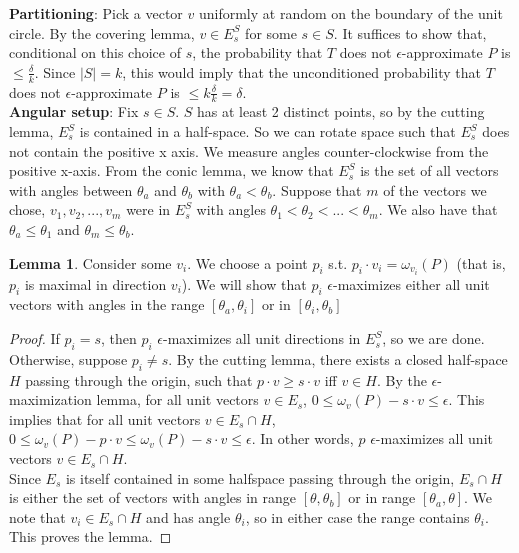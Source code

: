 \documentclass[12pt]{article}
\theoremstyle{definition}
\theoremstyle{lemma}
\newtheorem{lemma}{Lemma}[section]
\theoremstyle{theorem}
\begin{document}
\textbf{Partitioning}: Pick a vector $v$ uniformly at random on the boundary of the unit circle. By the covering lemma, $v \in E^S_s$ for some $s \in S$. It suffices to show that, conditional on this choice of $s$, the probability that $T$ does not $\epsilon$-approximate $P$ is $\leq \frac{\delta}{k}$. Since $|S| = k$, this would imply that the unconditioned probability that $T$ does not $\epsilon$-approximate $P$ is $\leq k\frac{\delta}{k} = \delta$.
\\

\textbf{Angular setup}: Fix $s \in S$. $S$ has at least 2 distinct points, so by the cutting lemma, $E^S_s$ is contained in a half-space. So we can rotate space such that $E^S_s$ does not contain the positive x axis. We measure angles counter-clockwise from the positive x-axis. From the conic lemma, we know that $E^S_s$ is the set of all vectors with angles between $\theta_a$ and $\theta_b$ with $\theta_a < \theta_b$. Suppose that $m$ of the vectors we chose, $v_1, v_2, ..., v_m$ were in $E^S_s$ with angles $\theta_1 < \theta_2 < ... < \theta_m$. We also have that $\theta_a \leq \theta_1$ and $\theta_m \leq \theta_b$.
\\

\begin{lemma}
Consider some $v_i$. We choose a point $p_i$ s.t. $p_i \cdot v_i = \omega_{v_i}(P)$ (that is, $p_i$ is maximal in direction $v_i$). We will show that $p_i$ $\epsilon$-maximizes either all unit vectors with angles in the range $[\theta_a, \theta_i]$ or in $[\theta_i, \theta_b]$
\end{lemma}

\begin{proof}
If $p_i = s$, then $p_i$ $\epsilon$-maximizes all unit directions in $E^S_s$, so we are done. Otherwise, suppose $p_i \neq s$. By the cutting lemma, there exists a closed half-space $H$ passing through the origin, such that $p \cdot v \geq s \cdot v$ iff $v \in H$. By the $\epsilon$-maximization lemma, for all unit vectors $v \in E_s$, $0 \leq \omega_v(P) - s \cdot v \leq \epsilon$. This implies that for all unit vectors $v \in E_s \cap H$, $0 \leq \omega_v(P) - p \cdot v \leq \omega_v(P) - s \cdot v \leq \epsilon$. In other words, $p$ $\epsilon$-maximizes all unit vectors $v \in E_s \cap H$.
\\

Since $E_s$ is itself contained in some halfspace passing through the origin, $E_s \cap H$ is either the set of vectors with angles in range $[\theta, \theta_b]$ or in range $[\theta_a, \theta]$. We note that $v_i \in E_s \cap H$ and has angle $\theta_i$, so in either case the range contains $\theta_i$. This proves the lemma.
\end{proof}
\end{document}
